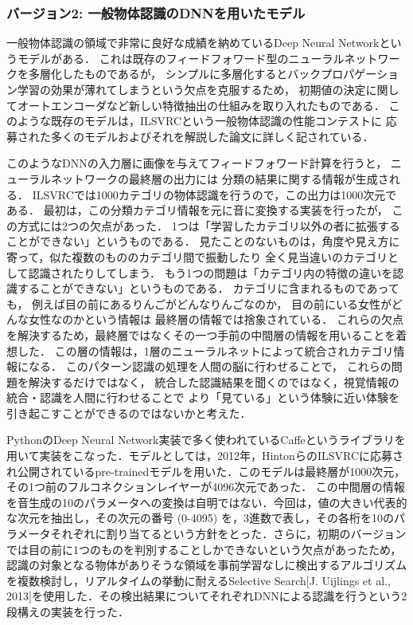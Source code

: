 \subsubsection{バージョン2: 一般物体認識のDNNを用いたモデル}

一般物体認識の領域で非常に良好な成績を納めているDeep Neural Networkというモデルがある．
これは既存のフィードフォワード型のニューラルネットワークを多層化したものであるが，
シンプルに多層化するとバックプロパゲーション学習の効果が薄れてしまうという欠点を克服するため，
初期値の決定に関してオートエンコーダなど新しい特徴抽出の仕組みを取り入れたものである．
このような既存のモデルは，ILSVRCという一般物体認識の性能コンテストに
応募された多くのモデルおよびそれを解説した論文に詳しく記されている．

このようなDNNの入力層に画像を与えてフィードフォワード計算を行うと，
ニューラルネットワークの最終層の出力には
分類の結果に関する情報が生成される．
ILSVRCでは1000カテゴリの物体認識を行うので，この出力は1000次元である．
最初は，この分類カテゴリ情報を元に音に変換する実装を行ったが，
この方式には2つの欠点があった．
1つは「学習したカテゴリ以外の者に拡張することができない」というものである．
見たことのないものは，角度や見え方に寄って，似た複数のもののカテゴリ間で振動したり
全く見当違いのカテゴリとして認識されたりしてしまう．
もう1つの問題は「カテゴリ内の特徴の違いを認識することができない」というものである．
カテゴリに含まれるものであっても，
例えば目の前にあるりんごがどんなりんごなのか，
目の前にいる女性がどんな女性なのかという情報は
最終層の情報では捨象されている．
これらの欠点を解決するため，最終層ではなくその一つ手前の中間層の情報を用いることを着想した．
この層の情報は，1層のニューラルネットによって統合されカテゴリ情報になる．
このパターン認識の処理を人間の脳に行わせることで，
これらの問題を解決するだけではなく，
統合した認識結果を聞くのではなく，視覚情報の統合・認識を人間に行わせることで
より「見ている」という体験に近い体験を引き起こすことができるのではないかと考えた．

PythonのDeep Neural Network実装で多く使われているCaffeというライブラリを用いて実装をこなった．モデルとしては，2012年，HintonらのILSVRCに応募され公開されているpre-trainedモデルを用いた．このモデルは最終層が1000次元，その1つ前のフルコネクションレイヤーが4096次元であった．
この中間層の情報を音生成の10のパラメータへの変換は自明ではない．今回は，値の大きい代表的な次元を抽出し，その次元の番号 (0-4095) を，3進数で表し，その各桁を10のパラメータそれぞれに割り当てるという方針をとった．さらに，初期のバージョンでは目の前に1つのものを判別することしかできないという欠点があったため，認識の対象となる物体がありそうな領域を事前学習なしに検出するアルゴリズムを複数検討し，リアルタイムの挙動に耐えるSelective Search[J. Uijlings et al., 2013]を使用した．その検出結果についてそれぞれDNNによる認識を行うという2段構えの実装を行った．

